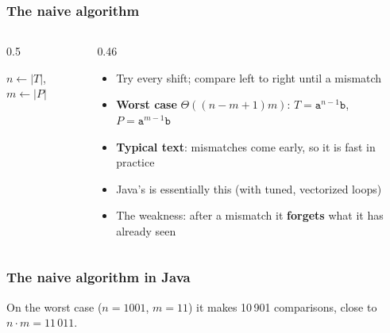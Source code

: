 \documentclass[aspectratio=169,10pt,compress]{beamer}
\begin{document}
\begin{frame}[t,fragile] \frametitle{The naive algorithm}
  \begin{columns}[T]
    \begin{column}{0.5\textwidth}
      \SetAlFnt{\small}


\begin{algorithm}[H]
  \caption{NaiveMatcher($T$, $P$)}
  $n \leftarrow |T|$, \quad $m \leftarrow |P|$\;
\end{algorithm}


    \end{column}
    \begin{column}{0.46\textwidth}
      \begin{itemize}\small
        
        \item Try every shift; compare left to right until a mismatch
        
        \item \textbf{Worst case} $\Theta((n - m + 1) m)$: 
        $T = \texttt{a}^{n-1}\texttt{b}$, 
        $P = \texttt{a}^{m-1}\texttt{b}$
        
        \item \textbf{Typical text}: mismatches come early, so it is fast in practice
        
        \item Java's  is essentially this (with tuned, vectorized loops)
        
        \item The weakness: after a mismatch it \textbf{forgets} what it has already seen
      
      \end{itemize}
    \end{column}
  \end{columns}
\end{frame}




\begin{frame}[t,fragile] \frametitle{The naive algorithm in Java}

  \vspace{0.2em}
  \small On the worst case ($n = 1001$, $m = 11$) it makes 10\,901 comparisons, close to $n \cdot m = 11\,011$.
\end{frame}
\end{document}
